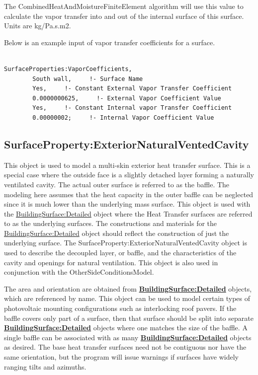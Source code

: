 The CombinedHeatAndMoistureFiniteElement algorithm will use this value to calculate the vapor transfer into and out of the internal surface of this surface. Units are kg/Pa.s.m2.

Below is an example input of vapor transfer coefficients for a surface.

\begin{lstlisting}

SurfaceProperties:VaporCoefficients,
        South wall,     !- Surface Name
        Yes,     !- Constant External Vapor Transfer Coefficient
        0.0000000625,     !- External Vapor Coefficient Value
        Yes,     !- Constant Internal vapor Transfer Coefficient
        0.00000002;     !- Internal Vapor Coefficient Value
\end{lstlisting}

\subsection{SurfaceProperty:ExteriorNaturalVentedCavity}\label{surfacepropertyexteriornaturalventedcavity}

This object is used to model a multi-skin exterior heat transfer surface. This is a special case where the outside face is a slightly detached layer forming a naturally ventilated cavity. The actual outer surface is referred to as the baffle. The modeling here assumes that the heat capacity in the outer baffle can be neglected since it is much lower than the underlying mass surface. This object is used with the \hyperref[buildingsurfacedetailed]{BuildingSurface:Detailed} object where the Heat Transfer surfaces are referred to as the underlying surfaces. The constructions and materials for the \hyperref[buildingsurfacedetailed]{BuildingSurface:Detailed} object should reflect the construction of just the underlying surface. The SurfaceProperty:ExteriorNaturalVentedCavity object is used to describe the decoupled layer, or baffle, and the characteristics of the cavity and openings for natural ventilation. This object is also used in conjunction with the OtherSideConditionsModel.

The area and orientation are obtained from \textbf{\hyperref[buildingsurfacedetailed]{BuildingSurface:Detailed}} objects, which are referenced by name. This object can be used to model certain types of photovoltaic mounting configurations such as interlocking roof pavers. If the baffle covers only part of a surface, then that surface should be split into separate \textbf{\hyperref[buildingsurfacedetailed]{BuildingSurface:Detailed}} objects where one matches the size of the baffle. A single baffle can be associated with as many \textbf{\hyperref[buildingsurfacedetailed]{BuildingSurface:Detailed}} objects as desired. The base heat transfer surfaces need not be contiguous nor have the same orientation, but the program will issue warnings if surfaces have widely ranging tilts and azimuths.

